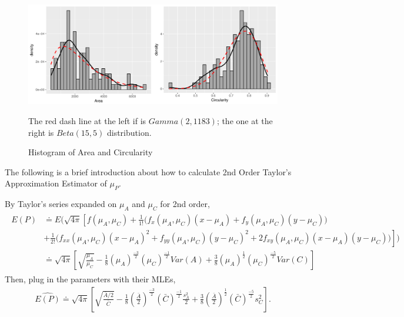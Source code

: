 \documentclass{article}\usepackage[]{graphicx}\usepackage[]{color}
\makeatletter
\def\maxwidth{ %
  \ifdim\Gin@nat@width>\linewidth
    \linewidth
  \else
    \Gin@nat@width
  \fi
}
\newenvironment{knitrout}{}{} %
\numberwithin{figure}{subsection} %
\numberwithin{table}{subsection} %
\makeatother
\begin{document}
\bigbreak
\begin{figure}[!htbp]
  \centering
\begin{knitrout}
\color{fgcolor}
\includegraphics[width=\maxwidth]{figure/unnamed-chunk-1-1} 

\end{knitrout}
  \caption{Histogram of Area and Circularity}
  \small
  The red dash line at the left if is $Gamma(2, 1183)$; the one at the right is $Beta(15, 5)$ distribution.
  \label{fig_area_cir}
\end{figure}

\newpage
The following is a brief introduction about how to calculate 2nd Order Taylor's Approximation Estimator of ${\mu}_{P}$.

\noindent 
By Taylor's series expanded on ${\mu}_{A}$ and ${\mu}_{C}$ for 2nd order,
\begin{align*}
\begin{split}
E(P) &\doteq E(\sqrt{4 \pi}\left[ f({\mu}_{A},{\mu}_{C})+\frac{1}{1!}\big({f}_{x}({\mu}_{A},{\mu}_{C})(x-{\mu}_{A})+ {f}_{y}({\mu}_{A},{\mu}_{C})(y-{\mu}_{C}) \big) \right.\\
& \left. +\frac{1}{2!} \big( {f}_{xx}({\mu}_{A},{\mu}_{C}){(x-{\mu}_{A})}^2+ {f}_{yy}({\mu}_{A},{\mu}_{C}){(y-{\mu}_{C})}^2+2{f}_{xy}({\mu}_{A},{\mu}_{C})(x-{\mu}_{A})(y-{\mu}_{C}) \big) \right ])\\
&\doteq \sqrt{4 \pi}\left[ \sqrt{\frac{{\mu}_{A}}{{\mu}_{C}}}- \frac{1}{8} ({\mu}_{A})^\frac{-3}{2}({\mu}_{C})^\frac{-1}{2}{Var(A)}+\frac{3}{8}({\mu}_{A})^\frac{1}{2}({\mu}_{C})^\frac{-5}{2}{Var(C)}\right ]
\end{split}
\end{align*}
Then, plug in the parameters with their MLEs,
\begin{align*}
\widehat{E(P)} \doteq \sqrt{4 \pi}\left[ \sqrt{\frac{\bar{A}/2}{\bar{C}}} - \frac{1}{8} (\frac{\bar{A}}{2})^\frac{-3}{2}(\bar{C})^\frac{-1}{2}\frac{{s}_{A}^2}{2}+\frac{3}{8}(\frac{\bar{A}}{2})^\frac{1}{2}(\bar{C})^\frac{-5}{2}{s}_{C}^2\right].
\end{align*}
\end{document}
